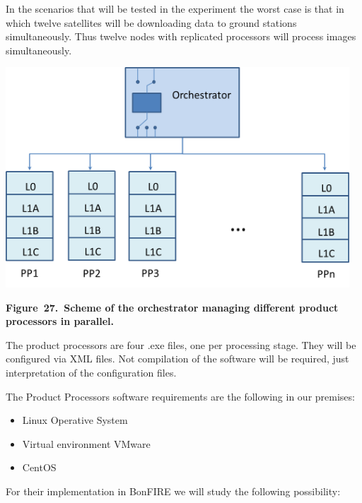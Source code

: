 \documentclass[a4paper]{article}
\newcommand\liststyleLFOxxix{%
\renewcommand\labelitemi{[F0B7?]}
\renewcommand\labelitemii{o}
\renewcommand\labelitemiii{[F0A7?]}
\renewcommand\labelitemiv{[F0B7?]}
}
\begin{document}
\bigskip


\bigskip

In the scenarios that will be tested in the experiment the worst case is
that in which twelve satellites will be downloading data to ground
stations simultaneously. Thus twelve nodes with replicated processors
will process images simultaneously.


\bigskip


\bigskip

{\centering 
\includegraphics[width=5.05745in,height=3.24601in]{out-img35.png} \par}

{\centering\bfseries
Figure\ 27.\ Scheme of the orchestrator managing different product
processors in parallel.
\par}


\bigskip

The product processors are four .exe files, one per processing stage.
They will be configured via XML files. Not compilation of the software
will be required, just interpretation of the configuration files.


\bigskip

The Product Processors software requirements are the following in our
premises:

\liststyleLFOxxix
\begin{itemize}
\item Linux Operative System
\item Virtual environment VMware
\item CentOS
\end{itemize}
For their implementation in BonFIRE we will study the following
possibility:
\end{document}
